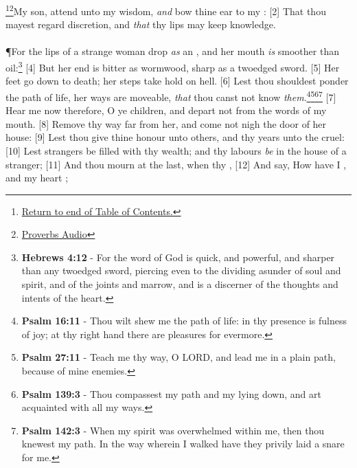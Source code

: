 \footnote{\textcolor[cmyk]{0.99998,1,0,0}{\hyperlink{TOC}{Return to end of Table of Contents.}}}\footnote{\href{https://audiobible.com/bible/proverbs_5.html}{\textcolor[cmyk]{0.99998,1,0,0}{Proverbs Audio}}}\textcolor[cmyk]{0.99998,1,0,0}{My son, attend unto my wisdom, \emph{and} bow thine ear to my :}
[2] \textcolor[cmyk]{0.99998,1,0,0}{That thou mayest regard discretion, and \emph{that} thy lips may keep knowledge.}\\
\\
\P \textcolor[cmyk]{0.99998,1,0,0}{For the lips of a strange woman drop \emph{as} an , and her mouth \emph{is} smoother than oil:}\footnote{\textbf{Hebrews 4:12} - For the word of God is quick, and powerful, and sharper than any twoedged sword, piercing even to the dividing asunder of soul and spirit, and of the joints and marrow, and is a discerner of the thoughts and intents of the heart.}
[4] \textcolor[cmyk]{0.99998,1,0,0}{But her end is bitter as wormwood, sharp as a twoedged sword.}
[5] \textcolor[cmyk]{0.99998,1,0,0}{Her feet go down to death; her steps take hold on hell.}
[6] \textcolor[cmyk]{0.99998,1,0,0}{Lest thou shouldest ponder the path of life, her ways are moveable, \emph{that} thou canst not know \emph{them}.}\footnote{\textbf{Psalm 16:11} - Thou wilt shew me the path of life: in thy presence is fulness of joy; at thy right hand there are pleasures for evermore.}\footnote{\textbf{Psalm 27:11} - Teach me thy way, O LORD, and lead me in a plain path, because of mine enemies.}\footnote{\textbf{Psalm 139:3} - Thou compassest my path and my lying down, and art acquainted with all my ways.}\footnote{\textbf{Psalm 142:3} - When my spirit was overwhelmed within me, then thou knewest my path. In the way wherein I walked have they privily laid a snare for me.}
[7] \textcolor[cmyk]{0.99998,1,0,0}{Hear me now therefore, O ye children, and depart not from the words of my mouth.}
[8] \textcolor[cmyk]{0.99998,1,0,0}{Remove thy way far from her, and come not nigh the door of her house:}
[9] \textcolor[cmyk]{0.99998,1,0,0}{Lest thou give thine honour unto others, and thy years unto the cruel:}
[10] \textcolor[cmyk]{0.99998,1,0,0}{Lest strangers be filled with thy wealth; and thy labours \emph{be} in the house of a stranger;}
[11] \textcolor[cmyk]{0.99998,1,0,0}{And thou mourn at the last, when thy ,}
[12] \textcolor[cmyk]{0.99998,1,0,0}{And say, How have I , and my heart ;}
